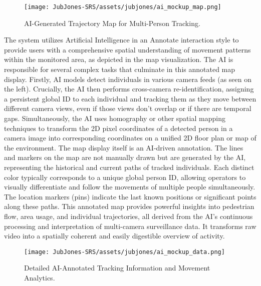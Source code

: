 \begin{figure}[!htb]
    \centering
    \texttt{[image: JubJones-SRS/assets/jubjones/ai\_mockup\_map.png]}
    \caption{AI-Generated Trajectory Map for Multi-Person Tracking.}
    \label{fig:ai_mockup_map}
\end{figure}

The system utilizes Artificial Intelligence in an Annotate interaction style to provide users with a comprehensive spatial understanding of movement patterns within the monitored area, as depicted in the map visualization. The AI is responsible for several complex tasks that culminate in this annotated map display.
Firstly, AI models detect individuals in various camera feeds (as seen on the left). Crucially, the AI then performs cross-camera re-identification, assigning a persistent global ID to each individual and tracking them as they move between different camera views, even if those views don't overlap or if there are temporal gaps. Simultaneously, the AI uses homography or other spatial mapping techniques to transform the 2D pixel coordinates of a detected person in a camera image into corresponding coordinates on a unified 2D floor plan or map of the environment.
The map display itself is an AI-driven annotation. The lines and markers on the map are not manually drawn but are generated by the AI, representing the historical and current paths of tracked individuals. Each distinct color typically corresponds to a unique global person ID, allowing operators to visually differentiate and follow the movements of multiple people simultaneously. The location markers (pins) indicate the last known positions or significant points along these paths. This annotated map provides powerful insights into pedestrian flow, area usage, and individual trajectories, all derived from the AI's continuous processing and interpretation of multi-camera surveillance data. It transforms raw video into a spatially coherent and easily digestible overview of activity.

\begin{figure}[H]
    \centering
    \texttt{[image: JubJones-SRS/assets/jubjones/ai\_mockup\_data.png]}
    \caption{Detailed AI-Annotated Tracking Information and Movement Analytics.}
    \label{fig:ai_mockup_data}
\end{figure}

